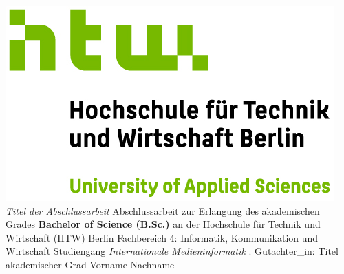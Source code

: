 
\begin{titlepage}
    \begin{center}
        \includegraphics{images/HTW_Berlin_Logo_farbig.jpg}
        \linebreak[4]
        \linebreak[4]
        \linebreak[4]
        \linebreak[4]
        \textit{\large Titel der Abschlussarbeit}
        \linebreak[4]
        \linebreak[4]
        \linebreak[4]
        Abschlussarbeit
        \linebreak[4]
        \linebreak[4]
        zur Erlangung des akademischen Grades
        \linebreak[4]
        \linebreak[4]
        \textbf{Bachelor of Science (B.Sc.)}
        \linebreak[4]
        \linebreak[4]
        an der
        \linebreak[4]
        \linebreak[4]
        Hochschule f\"ur Technik und Wirtschaft (HTW) Berlin
        \linebreak[4]
        Fachbereich 4: Informatik, Kommunikation und Wirtschaft
        \linebreak[4]
        Studiengang \textit{Internationale Medieninformatik}
        \linebreak[4]
        \linebreak[4]
        . Gutachter\_in: Titel akademischer Grad Vorname Nachname\linebreak[4]

\end{center}
\end{titlepage}
